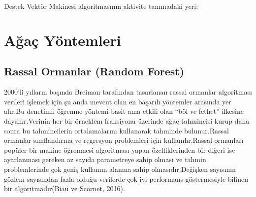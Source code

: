 \documentclass[12pt,twoside]{deuthesis}
\begin{document}
Destek Vektör Makinesi algoritmasının aktivite tanımadaki yeri;
\begin{table}

\caption{\label{tab:unnamed-chunk-2}Destek Vektör Makinesinin Aktivite Tanımadaki Yeri \label{tab:svmaktivite}}
\centering
{}
\end{table}
\hypertarget{aux11fauxe7-yuxf6ntemleri}{%
\section{Ağaç Yöntemleri}\label{aux11fauxe7-yuxf6ntemleri}}

\hypertarget{rassal-ormanlar-random-forest}{%
\subsection{Rassal Ormanlar (Random Forest)}\label{rassal-ormanlar-random-forest}}

2000'li yılların başında Breiman tarafından tasarlanan rassal ormanlar algoritması verileri işlemek için şu anda mevcut olan en başarılı yöntemler arasında yer alır.Bu denetimli öğrenme yöntemi basit ama etkili olan ``böl ve fethet'' ilkesine dayanır.Verinin her bir örneklem fraksiyonu üzerinde ağaç tahmincisi kurup daha sonra bu tahmincilerin ortalamalarını kullanarak tahminde bulunur.Rassal ormanlar sınıflandırma ve regresyon problemleri için kullanılır.Rassal ormanları popüler bir makine öğrenmesi algoritması yapan özelliklerinden bir diğeri ise ayarlanması gereken az sayıda parametreye sahip olması ve tahmin problemlerinde çok geniş kullanım alanına sahip olmasıdır.Değişken sayısının gözlem sayısından fazla olduğu verilerde çok iyi performans göstermesiyle bilinen bir algoritmadır(Biau ve Scornet, 2016).
\end{document}
